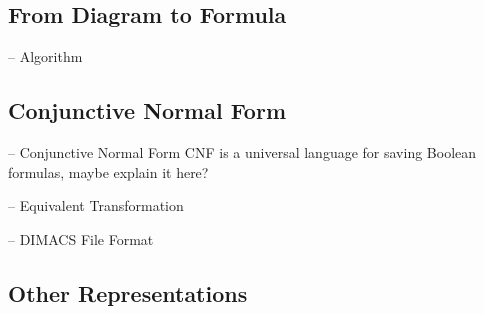 
\subsection{From Diagram to Formula}


\begin{frame}{-- Algorithm}

\end{frame}

\subsection{Conjunctive Normal Form}

\begin{frame}{-- Conjunctive Normal Form}
	CNF is a universal language for saving Boolean formulas, maybe explain it here?
\end{frame}

\begin{frame}{-- Equivalent Transformation}
	
\end{frame}

\begin{frame}{-- DIMACS File Format}
	
\end{frame}


\subsection{Other Representations} %

